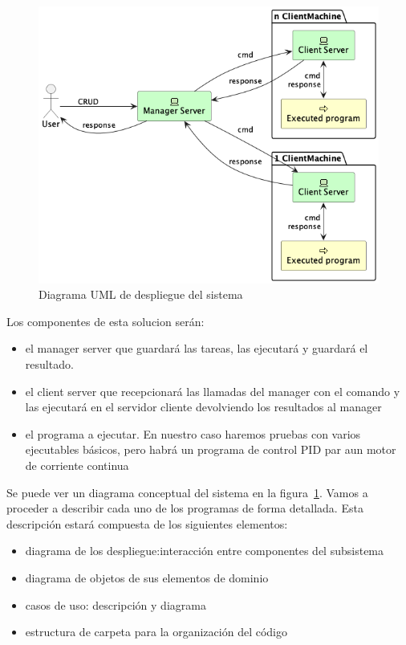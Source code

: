 
\begin{figure}[H]
    \centering
    \includegraphics[height=0.4\textheight]{./part/Proyecto_ejecutivo/memoria_descriptiva/descripcionDelProyecto/manager/uml/systemConcept}
    \caption{Diagrama UML de despliegue del sistema}\label{fig:Diagrama UML de despliegue del sistema}
\end{figure}

Los componentes de esta solucion serán:
\begin{itemize}
    \item el manager server que guardará las tareas, las ejecutará y guardará el resultado.
    \item el client server que recepcionará las llamadas del manager con el comando y las ejecutará en el servidor cliente devolviendo los resultados al manager
    \item el programa a ejecutar. En nuestro caso haremos pruebas con varios ejecutables básicos, pero habrá un programa de control PID par aun motor de corriente continua
\end{itemize}

Se puede ver un diagrama conceptual del sistema en la figura~\cref{fig:Diagrama UML de despliegue del sistema}. Vamos a proceder a describir cada uno de los programas de forma detallada. Esta descripción estará compuesta de los siguientes elementos:

\begin{itemize}
    \item diagrama de los despliegue:interacción entre componentes del subsistema
    \item diagrama de objetos de sus elementos de dominio
    \item casos de uso: descripción y diagrama
    \item estructura de carpeta para la organización del código
\end{itemize}

